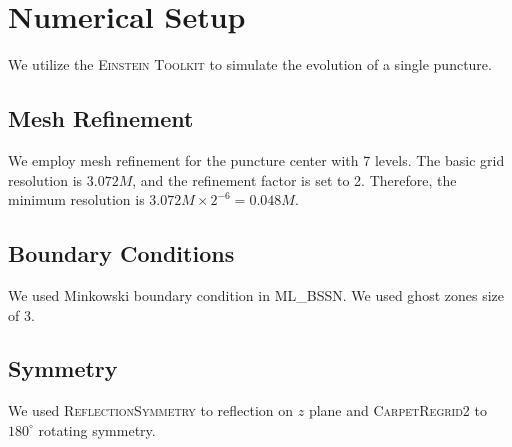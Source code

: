 \documentclass[%
 reprint,
 amsmath,amssymb,
 aps,
 prd,
]{revtex4-2}
\begin{document}
\section{Numerical Setup}

We utilize the \textsc{Einstein Toolkit} \cite{EinsteinToolkit:2023_05, Cactuscode:web} to simulate the evolution of a single puncture.

\subsection{Mesh Refinement}

We employ mesh refinement \cite{CarpetCode:web} for the puncture center with 7 levels. The basic grid resolution is $3.072M$, and the refinement factor is set to 2. Therefore, the minimum resolution is $3.072M\times 2^{-6} = 0.048M$.

\subsection{Boundary Conditions}
We used Minkowski boundary condition in \textsc{ML\_BSSN}. We used ghost zones size of 3.

\subsection{Symmetry}
We used \textsc{ReflectionSymmetry} to reflection on $z$ plane and \textsc{CarpetRegrid2} to $180^\circ$ rotating symmetry.



%
%
%
%
\end{document}
